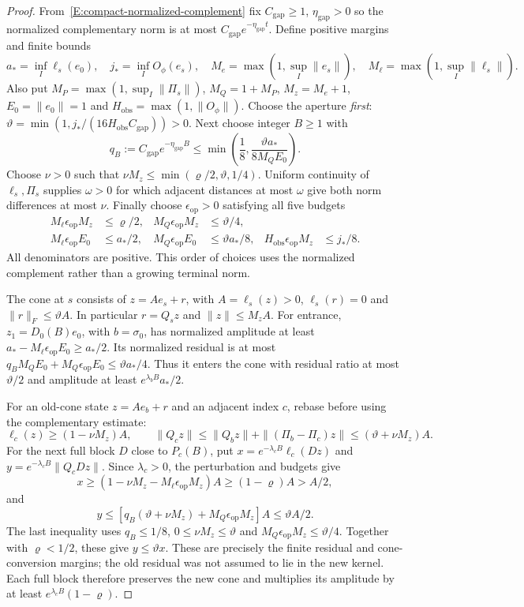 \begin{proof}
  From~\eqref{E:compact-normalized-complement} fix
  $C_{\mathrm{gap}}\ge1$, $\eta_{\mathrm{gap}}>0$ so the normalized
  complementary norm is at most
  $C_{\mathrm{gap}}e^{-\eta_{\mathrm{gap}}t}$.
  Define positive margins and finite bounds
  \[
    a_*=\inf_I\ell_s(e_0),\quad j_*=\inf_I O_\phi(e_s),\quad
    M_e=\max(1,\sup_I\|e_s\|),\quad
    M_\ell=\max(1,\sup_I\|\ell_s\|).
  \]
  Also put $M_P=\max(1,\sup_I\|\Pi_s\|)$,
  $M_Q=1+M_P$, $M_z=M_e+1$, $E_0=\|e_0\|=1$ and
  $H_{\mathrm{obs}}=\max(1,\|O_\phi\|)$.
  Choose the aperture \emph{first}:
  $\vartheta=\min(1,j_*/(16H_{\mathrm{obs}}C_{\mathrm{gap}}))>0$.
  Next choose integer $B\ge1$ with
  \[
    q_B:=C_{\mathrm{gap}}e^{-\eta_{\mathrm{gap}}B}
    \le\min\left(\frac18,\frac{\vartheta a_*}{8M_QE_0}\right).
  \]
  Choose $\nu>0$ such that
  $\nu M_z\le\min(\varrho/2,\vartheta,1/4)$.
  Uniform continuity of $\ell_s,\Pi_s$ supplies $\omega>0$
  for which adjacent distances at most $\omega$ give both norm
  differences at most $\nu$. Finally choose $\epsilon_{\mathrm{op}}>0$
  satisfying all five budgets
  \begin{align*}
    M_\ell\epsilon_{\mathrm{op}}M_z&\le\varrho/2,&
    M_Q\epsilon_{\mathrm{op}}M_z&\le\vartheta/4,\\
    M_\ell\epsilon_{\mathrm{op}}E_0&\le a_*/2,&
    M_Q\epsilon_{\mathrm{op}}E_0&\le\vartheta a_*/8,&
    H_{\mathrm{obs}}\epsilon_{\mathrm{op}}M_z&\le j_*/8.
  \end{align*}
  All denominators are positive. This order of choices uses the
  normalized complement rather than a growing terminal norm.

  The cone at $s$ consists of $z=Ae_s+r$, with
  $A=\ell_s(z)>0$, $\ell_s(r)=0$ and $\|r\|_F\le\vartheta A$.
  In particular $r=Q_sz$ and $\|z\|\le M_zA$.
  For entrance, $z_1=D_0(B)e_0$, with $b=\sigma_0$, has normalized
  amplitude at least
  $a_*-M_\ell\epsilon_{\mathrm{op}}E_0\ge a_*/2$.
  Its normalized residual is at most
  $q_BM_QE_0+M_Q\epsilon_{\mathrm{op}}E_0
  \le\vartheta a_*/4$.
  Thus it enters the cone with residual ratio at most $\vartheta/2$
  and amplitude at least $e^{\lambda_bB}a_*/2$.

  For an old-cone state $z=Ae_b+r$ and an adjacent index $c$,
  rebase before using the complementary estimate:
  \[
    \ell_c(z)\ge(1-\nu M_z)A,\qquad
    \|Q_cz\|\le\|Q_bz\|+\|(\Pi_b-\Pi_c)z\|
    \le(\vartheta+\nu M_z)A.
  \]
  For the next full block $D$ close to $P_c(B)$, put
  $x=e^{-\lambda_cB}\ell_c(Dz)$ and
  $y=e^{-\lambda_cB}\|Q_cDz\|$.
  Since $\lambda_c>0$, the perturbation and budgets give
  \[
    x\ge(1-\nu M_z-M_\ell\epsilon_{\mathrm{op}}M_z)A
    \ge(1-\varrho)A>A/2,
  \]
  and
  \[
    y\le
    [q_B(\vartheta+\nu M_z)+M_Q\epsilon_{\mathrm{op}}M_z]A
    \le\vartheta A/2.
  \]
  The last inequality uses
  $q_B\le1/8$, $0\le\nu M_z\le\vartheta$ and
  $M_Q\epsilon_{\mathrm{op}}M_z\le\vartheta/4$.
  Together with $\varrho<1/2$, these give $y\le\vartheta x$.
  These are precisely the finite residual and cone-conversion margins;
  the old residual was not assumed to lie in the new kernel.
  Each full block therefore preserves the new cone and multiplies
  its amplitude by at least $e^{\lambda_cB}(1-\varrho)$.


\end{proof}
